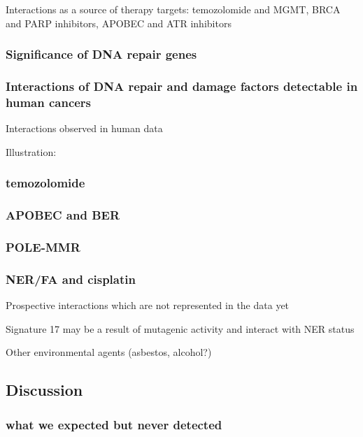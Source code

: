 Interactions as a source of therapy targets: temozolomide and MGMT, BRCA and PARP inhibitors, APOBEC and ATR inhibitors

\subsubsection{Significance of DNA repair genes}


\subsubsection{Interactions of DNA repair and damage factors detectable in human cancers}

Interactions observed in human data

Illustration:

\subsubsection*{temozolomide}

\subsubsection*{APOBEC and BER}

\subsubsection*{POLE-MMR}

\subsubsection*{NER/FA and cisplatin}

Prospective interactions which are not represented in the data yet

Signature 17 may be a result of mutagenic activity and interact with NER status

Other environmental agents (asbestos, alcohol?)


\subsection{Discussion}

\subsubsection*{what we expected but never detected}

